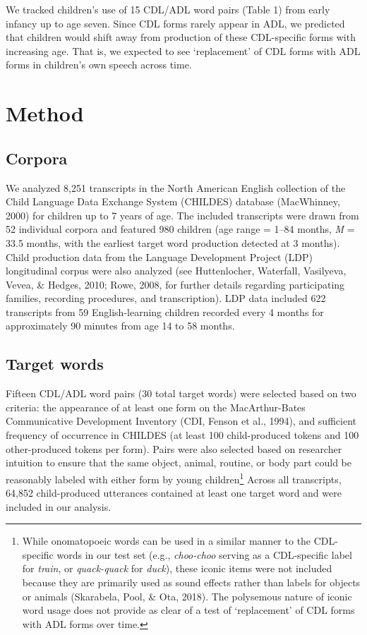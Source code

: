 \documentclass[10pt, letterpaper]{article}
\begin{document}
We tracked children's use of 15 CDL/ADL word pairs (Table 1) from early
infancy up to age seven. Since CDL forms rarely appear in ADL, we
predicted that children would shift away from production of these
CDL-specific forms with increasing age. That is, we expected to see
`replacement' of CDL forms with ADL forms in children's own speech
across time.

\hypertarget{method}{%
\section{Method}\label{method}}

\hypertarget{corpora}{%
\subsection{Corpora}\label{corpora}}

We analyzed 8,251 transcripts in the North American English collection
of the Child Language Data Exchange System (CHILDES) database
(MacWhinney, 2000) for children up to 7 years of age. The included
transcripts were drawn from 52 individual corpora and featured 980
children (age range = 1--84 months, \emph{M} = 33.5 months, with the
earliest target word production detected at 3 months). Child production
data from the Language Development Project (LDP) longitudinal corpus
were also analyzed (see Huttenlocher, Waterfall, Vasilyeva, Vevea, \&
Hedges, 2010; Rowe, 2008, for further details regarding participating
families, recording procedures, and transcription). LDP data included
622 transcripts from 59 English-learning children recorded every 4
months for approximately 90 minutes from age 14 to 58 months.

\hypertarget{target-words}{%
\subsection{Target words}\label{target-words}}

Fifteen CDL/ADL word pairs (30 total target words) were selected based
on two criteria: the appearance of at least one form on the
MacArthur-Bates Communicative Development Inventory (CDI, Fenson et al.,
1994), and sufficient frequency of occurrence in CHILDES (at least 100
child-produced tokens and 100 other-produced tokens per form). Pairs
were also selected based on researcher intuition to ensure that the same
object, animal, routine, or body part could be reasonably labeled with
either form by young children\footnote{While onomatopoeic words can be
  used in a similar manner to the CDL-specific words in our test set
  (e.g., \emph{choo-choo} serving as a CDL-specific label for
  \emph{train}, or \emph{quack-quack} for \emph{duck}), these iconic
  items were not included because they are primarily used as sound
  effects rather than labels for objects or animals (Skarabela, Pool, \&
  Ota, 2018). The polysemous nature of iconic word usage does not
  provide as clear of a test of `replacement' of CDL forms with ADL
  forms over time.} Across all transcripts, 64,852 child-produced
utterances contained at least one target word and were included in our
analysis.
\end{document}
